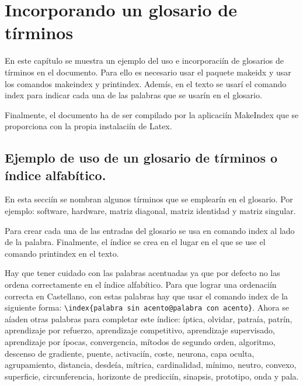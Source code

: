 \chapter{Incorporando un glosario de tírminos}

En este capítulo se muestra un ejemplo del uso e incorporaciín de glosarios de tírminos en el documento. Para ello es necesario usar el paquete makeidx y usar los comandos makeindex y printindex. Ademís, en el texto se usarí el comando index para indicar cada una de las palabras que se usarín en el glosario.

Finalmente, el documento ha de ser compilado por la aplicaciín MakeIndex que se proporciona con la propia instalaciín de Latex.

\section{Ejemplo de uso de un glosario de tírminos o índice alfabítico.}

En esta secciín se nombran algunos tírminos que se emplearín en el glosario. Por ejemplo: software, hardware, matriz diagonal, matriz identidad y matriz singular.

Para crear cada una de las entradas del glosario se usa en comando index al lado de la palabra. Finalmente, el índice se crea en el lugar en el que se use el comando printindex en el texto.

Hay que tener cuidado con las palabras acentuadas ya que por defecto no las ordena correctamente en el índice alfabítico. Para que lograr una ordenaciín correcta en Cas\-te\-llano, con estas palabras hay que usar el comando index de la siguiente forma: \verb+\index{palabra sin acento@palabra con acento}+. Ahora se aíaden otras palabras para completar este índice: íptica, olvidar, patraía, patrín, aprendizaje por refuerzo, aprendizaje competitivo, aprendizaje supervisado, aprendizaje por ípocas, convergencia, mítodos de segundo orden, algoritmo, descenso de gradiente, puente, activaciín, coste, neurona, capa oculta, agrupamiento, distancia, desdeía, mítrica, cardinalidad, mínimo, neutro, convexo, superficie, circunferencia, horizonte de predicciín, sinapsis, prototipo, onda y pala. 